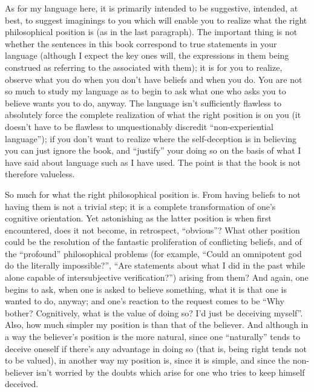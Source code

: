 As for my language here, it is primarily intended to be suggestive, intended, at best, to suggest imaginings to you which will enable you to realize what the right philosophical position is (as in the last paragraph). The important thing is not whether the sentences in this book correspond to true statements in your language (although I expect the key ones will, the expressions in them being construed as referring to the associated with them); it is for you to realize, observe what you do when you don't have beliefs and when you do. You are not so much to study my language as to begin to ask what one who asks you to believe wants you to do, anyway. The language isn't sufficiently flawless to absolutely force the complete realization of what the right position is on you (it doesn't have to be flawless to unquestionably discredit \enquote{non-experiential language}); if you don't want to realize where the self-deception is in believing you can just ignore the book, and \enquote{justify} your doing so on the basis of what I have said about language such as I have used. The point is that the book is not therefore valueless. 

So much for what the right philosophical position is. From having beliefs to not having them is not a trivial step; it is a complete transformation of one's cognitive orientation. Yet astonishing as the latter position is when first encountered, does it not become, in retrospect, \enquote{obvious}? What other position could be the resolution of the fantastic proliferation of conflicting beliefs, and of the \enquote{profound} philosophical problems (for example, \enquote{Could an omnipotent god do the literally impossible?}, \enquote{Are statements about what I did in the past while alone capable of intersubjective verification?}) arising from them? And again, one begins to ask, when one is asked to believe something, what it is that one is wanted to do, anyway; and one's reaction to the request comes to be \enquote{Why bother? Cognitively, what is the value of doing so? I'd just be deceiving myself}. Also, how much simpler my position is than that of the believer. And although in a way the believer's position is the more natural, since one \enquote{naturally} tends to deceive oneself if there's any advantage in doing so (that is, being right tends not to be valued), in another way my position is, since it is simple, and since the non-believer isn't worried by the doubts which arise for one who tries to keep himself deceived. 

